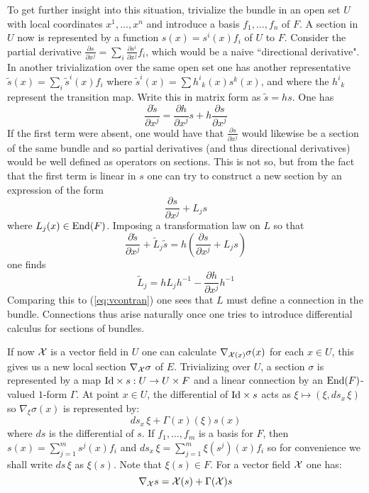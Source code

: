 \documentclass[12pt,titlepage]{article}
\def\cX{{\cal X}}
\def\End{\hbox{End}}
\def\Id{\hbox{Id}}
\begin{document}
To get further insight into this situation, trivialize the bundle in an
open set \(U\) with local coordinates \(x^1,\dots, x^n\) and introduce a
basis \(f_1,\dots,f_n\) of \(F\). A section in \(U\) now is represented
by a function \(s(x)=s^i(x)f_i\) of \(U\) to \(F\). Consider the
partial derivative \(\frac{\partial s}{\partial x^j}=
\sum_i\frac{\partial s^i}{\partial x^j}f_i\), 
which would be a naive
``directional derivative". In another trivialization over the same open
set one has another representative \(\tilde s(x) =\sum_i\tilde s^i(x)f_i\)
 where 
\(\tilde s^i(x) = \sum h^i{}_k(x)s^k(x)\), and where the \(h^i{}_k\)
represent the transition map. Write this in matrix form 
as \(\tilde s = h s\). One has 
\[
\frac{\partial \tilde s}{\partial x^j}= \frac{\partial h}{\partial x^j}s
+h\frac{\partial s}{\partial x^j}
\]
If the first term were  absent, one would have that 
\(\frac{\partial s}{\partial x^j}\)
would likewise be a section of the same bundle and so partial
derivatives (and thus directional derivatives) would be well defined 
as operators on sections.  This is not so, but from the fact that the
first term is linear in \(s\) one can try to construct a new section
by an expression of the form 
\[
\frac{\partial s}{\partial x^j} + L_j s
\] 
where \(L_j(x) \in \End(F)\). Imposing a transformation law on
\(L\) so that 
\[
\frac{\partial \tilde s}{\partial x^j} + \tilde L_j \tilde s=
h(\frac{\partial s}{\partial x^j} + L_j s)
\] 
one finds 
\[
\tilde L_j = h L_j h^{-1} - \frac{\partial h}{\partial x^j}h^{-1}
\]
Comparing this to (\ref{eq:vcontran}) one sees that \(L\) must
define a connection in the bundle. Connections thus arise naturally once
one tries to introduce differential calculus for sections of bundles.

If now \(\cX\) is a vector field in \(U\) one can calculate
\(\nabla_{\cX(x)}\sigma(x)\) for each \(x\in U\),
this gives us a new local section \(\nabla_{\cX}\sigma\)
\index{\(\zeta_X\)@\(\nabla_{\cX}\)}%
of \(E\).
Trivializing over \(U\), a section
\(\sigma\) is represented by a map \(\Id\times s: U \to U\times F\)
and a linear connection by an \(\End(F)\)-valued  \(1\)-form
\(\Gamma\).  At point \(x\in U\), the differential of \(\Id\times s\)
acts as \(\xi \mapsto (\xi, ds_x\,\xi)\) so \(\nabla_\xi\sigma(x)\) is
represented by:
\begin{equation}%
ds_x\,\xi + \Gamma(x)(\xi)s(x)
\end{equation}%
where \(ds\) is the differential of \(s\). If \(f_1,\dots,f_m\) is a
basis for \(F\), then \(s(x)=\sum_{j=1}^ms^j(x)f_i\) and
\(ds_x\,\xi=\sum_{j=1}^m\xi(s^j)(x)f_i\) so for convenience we shall
write \(ds\,\xi\) as \(\xi(s)\). Note that \(\xi(s) \in F\). For a
vector field \(\cX\) one has:
\begin{equation}\label{eq:lincd}%
\nabla_\cX s = \cX(s) + \Gamma(\cX)s
\end{equation}%
\end{document}
